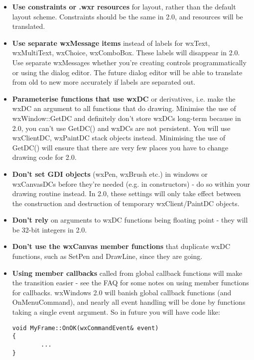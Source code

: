 \begin{itemize}
\item {\bf Use constraints or .wxr resources} for layout, rather than the default layout scheme.
Constraints should be the same in 2.0, and resources will be translated.
\item {\bf Use separate wxMessage items} instead of labels for wxText, wxMultiText,
wxChoice, wxComboBox. These labels will disappear in 2.0. Use separate
wxMessages whether you're creating controls programmatically or using
the dialog editor. The future dialog editor will be able to translate
from old to new more accurately if labels are separated out.
\item {\bf Parameterise functions that use wxDC} or derivatives, i.e. make the wxDC
an argument to all functions that do drawing. Minimise the use of
wxWindow::GetDC and definitely don't store wxDCs long-term
because in 2.0, you can't use GetDC() and wxDCs are not persistent.
You will use wxClientDC, wxPaintDC stack objects instead. Minimising
the use of GetDC() will ensure that there are very few places you
have to change drawing code for 2.0.
\item {\bf Don't set GDI objects} (wxPen, wxBrush etc.) in windows or wxCanvasDCs before they're
needed (e.g. in constructors) - do so within your drawing routine instead. In
2.0, these settings will only take effect between the construction and destruction
of temporary wxClient/PaintDC objects.
\item {\bf Don't rely} on arguments to wxDC functions being floating point - they will
be 32-bit integers in 2.0.
\item {\bf Don't use the wxCanvas member functions} that duplicate wxDC functions, such as SetPen and DrawLine, since
they are going.
\item {\bf Using member callbacks} called from global callback functions will make the transition
easier - see the FAQ
for some notes on using member functions for callbacks. wxWindows 2.0 will banish global
callback functions (and OnMenuCommand), and nearly all event handling will be done by functions taking a single event argument.
So in future you will have code like:

{\small\begin{verbatim}
void MyFrame::OnOK(wxCommandEvent& event)
{
        ...
}
\end{verbatim}
}%


\end{itemize}
